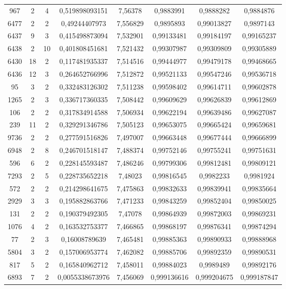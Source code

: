 \begin{longtable}{|c|c|c|c|c|c|c|c|}
967 & 2 & 4 & 0,519898093151 & 7,56378 & 0,9883991 & 0,9888282 & 0,9884876 \\
6477 & 2 & 2 & 0,49244407973 & 7,556829 & 0,9895893 & 0,99013827 & 0,9897143 \\
6437 & 9 & 3 & 0,415498873094 & 7,532901 & 0,99133481 & 0,99184197 & 0,99165237 \\
6438 & 2 & 10 & 0,401808451681 & 7,521432 & 0,99307987 & 0,99309809 & 0,99305889 \\
6430 & 18 & 2 & 0,117481935337 & 7,514516 & 0,99444977 & 0,99479178 & 0,99468665 \\
6436 & 12 & 3 & 0,264652766996 & 7,512872 & 0,99521133 & 0,99547246 & 0,99536718 \\
95 & 3 & 2 & 0,332483126302 & 7,511238 & 0,99598402 & 0,99614711 & 0,99602878 \\
1265 & 2 & 3 & 0,336717360335 & 7,508442 & 0,99609629 & 0,99626839 & 0,99612869 \\
106 & 2 & 2 & 0,317834914588 & 7,506934 & 0,99622194 & 0,99639486 & 0,99627087 \\
239 & 11 & 2 & 0,329291346786 & 7,505123 & 0,99653075 & 0,99665424 & 0,99659681 \\
9736 & 2 & 2 & 0,277591516826 & 7,497007 & 0,99663448 & 0,99677444 & 0,99666899 \\
6948 & 2 & 8 & 0,246701518147 & 7,488374 & 0,99752146 & 0,99755241 & 0,99751631 \\
596 & 6 & 2 & 0,228145593487 & 7,486246 & 0,99799306 & 0,99812481 & 0,99809121 \\
7293 & 2 & 5 & 0,228735652218 & 7,48023 & 0,99816545 & 0,9982233 & 0,9981924 \\
572 & 2 & 2 & 0,214298641675 & 7,475863 & 0,99832633 & 0,99839941 & 0,99835664 \\
2929 & 3 & 3 & 0,195882863766 & 7,471233 & 0,99843259 & 0,99852404 & 0,99850025 \\
131 & 2 & 2 & 0,190379492305 & 7,47078 & 0,99864939 & 0,99872003 & 0,99869231 \\
1076 & 4 & 2 & 0,163532753377 & 7,466865 & 0,99868197 & 0,99876341 & 0,99874294 \\
77 & 2 & 3 & 0,16008789639 & 7,465481 & 0,99885363 & 0,99890933 & 0,99888968 \\
5804 & 3 & 2 & 0,157006953774 & 7,462082 & 0,99885706 & 0,99892359 & 0,99890531 \\
817 & 5 & 2 & 0,165840962712 & 7,458011 & 0,99884023 & 0,9989489 & 0,99892176 \\
6893 & 7 & 2 & 0,0055338673976 & 7,456069 & 0,999136616 & 0,999204675 & 0,999187847 \\

\end{longtable}
